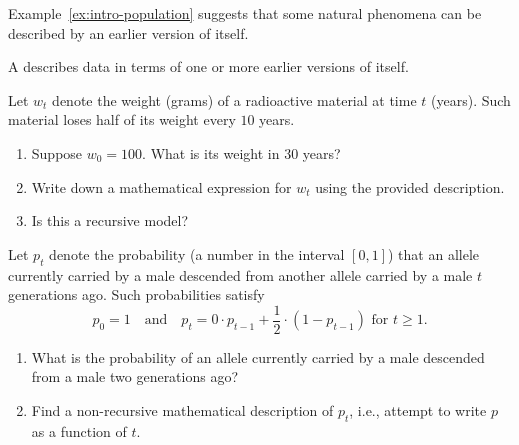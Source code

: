 \documentclass[../main.tex]{subfiles}
\begin{document}
Example~\ref{ex:intro-population} suggests that some natural phenomena can be described by an earlier version of itself. 

\begin{mdframed}[style=simple-compact]
 A  describes data in terms of one or more earlier versions of itself.
\end{mdframed}

\begin{example}
  Let \(w_{t}\) denote the weight (grams) of a radioactive material at time \(t\) (years). Such material loses half of its weight every \(10\) years. 
  \begin{enumerate}[wide]
    \item Suppose \(w_{0} = 100\). What is its weight in \(30\) years?
    \item Write down a mathematical expression for \(w_{t}\) using the provided description.
    \item Is this a recursive model?
  \end{enumerate}
\end{example}

\clearpage
\begin{example}
  Let \(p_{t}\) denote the probability (a number in the interval \([0,1]\)) that an allele currently carried by a male descended from another allele carried by a male \(t\) generations ago.  Such probabilities satisfy
  \[
     p_{0} = 1 \quad \text{and}\quad p_{t} = 0 \cdot p_{t - 1}  + \frac{1}{2} \cdot (1 - p_{t-1}) \text{ for } t \ge 1.
  \]
  \begin{enumerate}[wide]
    \item What is the probability of an allele currently carried by a male descended from a male two generations ago?
    \item Find a non-recursive mathematical description of \(p_{t}\), i.e., attempt to write \(p\) as a function of \(t\).
  \end{enumerate}
\end{example}
\end{document}
